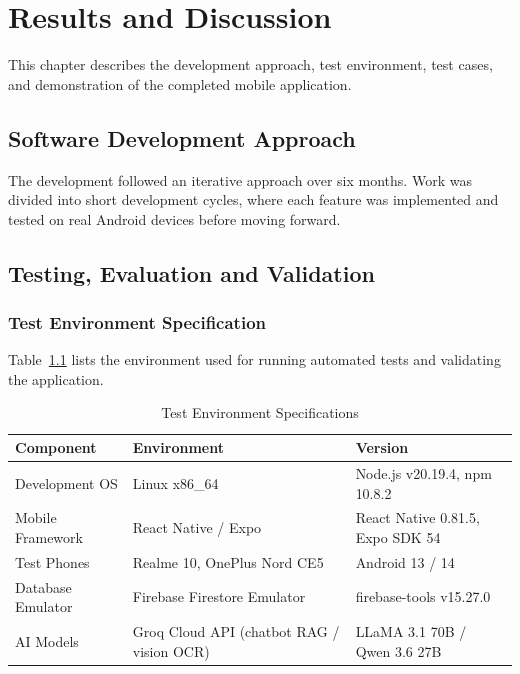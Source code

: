 \documentclass[12pt]{report}
\begin{document}
\newpage
\chapter{Results and Discussion}

This chapter describes the development approach, test environment, test cases, and demonstration of the completed mobile application.

\section{Software Development Approach}
The development followed an iterative approach over six months. Work was divided into short development cycles, where each feature was implemented and tested on real Android devices before moving forward.

\section{Testing, Evaluation and Validation}

\subsection{Test Environment Specification}
Table~\ref{tab:test_env} lists the environment used for running automated tests and validating the application.

\begin{table}[H]
\centering
\caption{Test Environment Specifications}
\label{tab:test_env}
\small
\begin{tabular}{|l|p{4.5cm}|p{6.0cm}|}
\hline
\textbf{Component} & \textbf{Environment} & \textbf{Version} \\
\hline
Development OS & Linux x86\_64 & Node.js v20.19.4, npm 10.8.2 \\
\hline
Mobile Framework & React Native / Expo & React Native 0.81.5, Expo SDK 54 \\
\hline
Test Phones & Realme 10, OnePlus Nord CE5 & Android 13 / 14 \\
\hline
Database Emulator & Firebase Firestore Emulator & firebase-tools v15.27.0 \\
\hline
AI Models & Groq Cloud API (chatbot RAG / vision OCR) & LLaMA 3.1 70B / Qwen 3.6 27B \\
\hline
\end{tabular}
\end{table}
\end{document}
